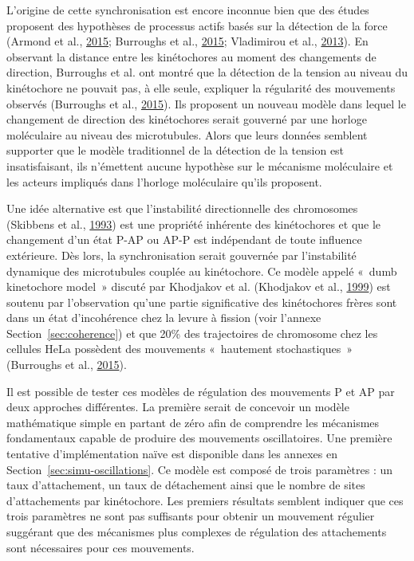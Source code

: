 \documentclass[12pt,a4paper,twoside,openright]{book}
\begin{document}
L'origine de cette synchronisation est encore inconnue bien que des
études proposent des hypothèses de processus actifs basés sur la
détection de la force (Armond et al.,
\protect\hyperlink{ref-Armond2015}{2015}; Burroughs et al.,
\protect\hyperlink{ref-Burroughs2015}{2015}; Vladimirou et al.,
\protect\hyperlink{ref-Vladimirou2013}{2013}). En observant la distance
entre les kinétochores au moment des changements de direction, Burroughs
et al. ont montré que la détection de la tension au niveau du
kinétochore ne pouvait pas, à elle seule, expliquer la régularité des
mouvements observés (Burroughs et al.,
\protect\hyperlink{ref-Burroughs2015}{2015}). Ils proposent un nouveau
modèle dans lequel le changement de direction des kinétochores serait
gouverné par une horloge moléculaire au niveau des microtubules. Alors
que leurs données semblent supporter que le modèle traditionnel de la
détection de la tension est insatisfaisant, ils n'émettent aucune
hypothèse sur le mécanisme moléculaire et les acteurs impliqués dans
l'horloge moléculaire qu'ils proposent.

Une idée alternative est que l'instabilité directionnelle des
chromosomes (Skibbens et al.,
\protect\hyperlink{ref-Skibbens1993}{1993}) est une propriété inhérente
des kinétochores et que le changement d'un état P-AP ou AP-P est
indépendant de toute influence extérieure. Dès lors, la synchronisation
serait gouvernée par l'instabilité dynamique des microtubules couplée au
kinétochore. Ce modèle appelé «~dumb kinetochore model~» discuté par
Khodjakov et al. (Khodjakov et al.,
\protect\hyperlink{ref-Khodjakov1999}{1999}) est soutenu par
l'observation qu'une partie significative des kinétochores frères sont
dans un état d'incohérence chez la levure à fission (voir l'annexe
Section~\ref{sec:coherence}) et que 20\% des trajectoires de chromosome
chez les cellules HeLa possèdent des mouvements «~hautement
stochastiques~» (Burroughs et al.,
\protect\hyperlink{ref-Burroughs2015}{2015}).

Il est possible de tester ces modèles de régulation des mouvements P et
AP par deux approches différentes. La première serait de concevoir un
modèle mathématique simple en partant de zéro afin de comprendre les
mécanismes fondamentaux capable de produire des mouvements
oscillatoires. Une première tentative d'implémentation naïve est
disponible dans les annexes en Section~\ref{sec:simu-oscillations}. Ce
modèle est composé de trois paramètres : un taux d'attachement, un taux
de détachement ainsi que le nombre de sites d'attachements par
kinétochore. Les premiers résultats semblent indiquer que ces trois
paramètres ne sont pas suffisants pour obtenir un mouvement régulier
suggérant que des mécanismes plus complexes de régulation des
attachements sont nécessaires pour ces mouvements.
\end{document}
